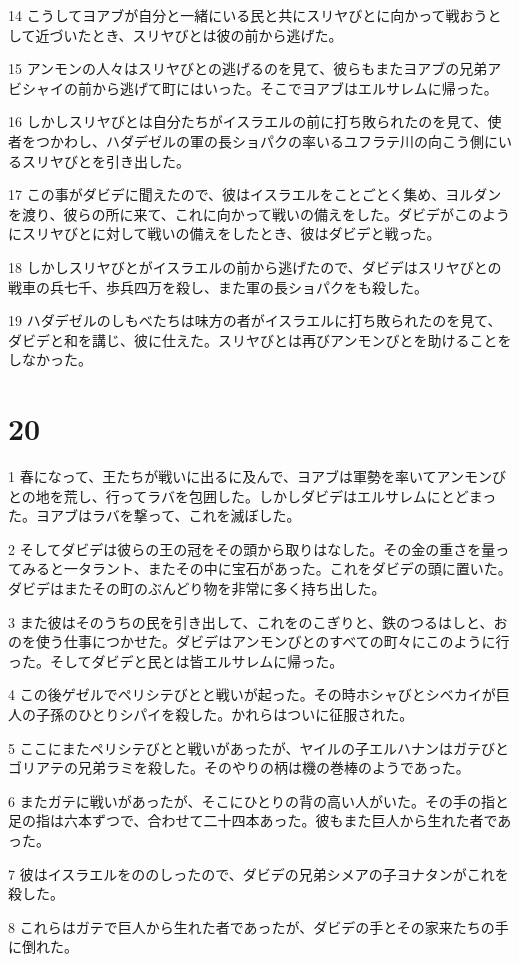 \par 14 こうしてヨアブが自分と一緒にいる民と共にスリヤびとに向かって戦おうとして近づいたとき、スリヤびとは彼の前から逃げた。
\par 15 アンモンの人々はスリヤびとの逃げるのを見て、彼らもまたヨアブの兄弟アビシャイの前から逃げて町にはいった。そこでヨアブはエルサレムに帰った。
\par 16 しかしスリヤびとは自分たちがイスラエルの前に打ち敗られたのを見て、使者をつかわし、ハダデゼルの軍の長ショパクの率いるユフラテ川の向こう側にいるスリヤびとを引き出した。
\par 17 この事がダビデに聞えたので、彼はイスラエルをことごとく集め、ヨルダンを渡り、彼らの所に来て、これに向かって戦いの備えをした。ダビデがこのようにスリヤびとに対して戦いの備えをしたとき、彼はダビデと戦った。
\par 18 しかしスリヤびとがイスラエルの前から逃げたので、ダビデはスリヤびとの戦車の兵七千、歩兵四万を殺し、また軍の長ショパクをも殺した。
\par 19 ハダデゼルのしもべたちは味方の者がイスラエルに打ち敗られたのを見て、ダビデと和を講じ、彼に仕えた。スリヤびとは再びアンモンびとを助けることをしなかった。

\chapter{20}

\par 1 春になって、王たちが戦いに出るに及んで、ヨアブは軍勢を率いてアンモンびとの地を荒し、行ってラバを包囲した。しかしダビデはエルサレムにとどまった。ヨアブはラバを撃って、これを滅ぼした。
\par 2 そしてダビデは彼らの王の冠をその頭から取りはなした。その金の重さを量ってみると一タラント、またその中に宝石があった。これをダビデの頭に置いた。ダビデはまたその町のぶんどり物を非常に多く持ち出した。
\par 3 また彼はそのうちの民を引き出して、これをのこぎりと、鉄のつるはしと、おのを使う仕事につかせた。ダビデはアンモンびとのすべての町々にこのように行った。そしてダビデと民とは皆エルサレムに帰った。
\par 4 この後ゲゼルでペリシテびとと戦いが起った。その時ホシャびとシベカイが巨人の子孫のひとりシパイを殺した。かれらはついに征服された。
\par 5 ここにまたペリシテびとと戦いがあったが、ヤイルの子エルハナンはガテびとゴリアテの兄弟ラミを殺した。そのやりの柄は機の巻棒のようであった。
\par 6 またガテに戦いがあったが、そこにひとりの背の高い人がいた。その手の指と足の指は六本ずつで、合わせて二十四本あった。彼もまた巨人から生れた者であった。
\par 7 彼はイスラエルをののしったので、ダビデの兄弟シメアの子ヨナタンがこれを殺した。
\par 8 これらはガテで巨人から生れた者であったが、ダビデの手とその家来たちの手に倒れた。


